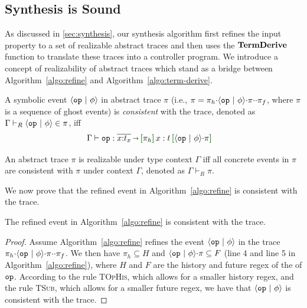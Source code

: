 \subsection{Synthesis is Sound}

As discussed in \autoref{sec:synthesis}, our synthesis algorithm first
refines the input property to a set of realizable abstract
traces and then uses the \(\S{TermDerive}\) function to translate these
traces into a controller program. We introduce a concept of realizability of abstract traces which stand as a bridge between Algorithm~\ref{algo:refine} and Algorithm~\ref{algo:term-derive}.

\begin{definition}
  \label{def:real-event-def}
  A symbolic event $\msg{op}{\phi}$ in abstract trace $\pi$ (i.e.,
  $\pi = \pi_h \seqA \msg{op}{\phi} \seqA \pi \seqA \seqA \pi_f$, where $\pi$ is a sequence of ghost events) is
  \emph{consistent} with the trace,
  denoted as $\Gamma \vdash_{R} \msg{op}{\phi} \in \pi$, iff {\small\begin{align*}
    &\Gamma \vdash \eff{op} : \overline{x{:}t_x}\sarr \uhat{\pi_h}{x:t}{\msg{op}{\phi}\seqA\pi}
\end{align*}}\noindent
\end{definition}

\begin{definition}[Realizability]
  \label{def:real-trace-def}
  An abstract trace $\pi$ is realizable under type context $\Gamma$ iff all concrete events in $\pi$ are consistent with $\pi$ under context $\Gamma$, denoted as $\Gamma \vdash_{R} \pi$.
\end{definition}

We now prove that the refined event in Algorithm~\ref{algo:refine} is consistent with the trace.

\begin{lemma}
  \label{lemma:real-event}
  The refined event in Algorithm~\ref{algo:refine} is consistent with the trace.
\end{lemma}
\begin{proof}
  Assume Algorithm~\ref{algo:refine} refines the event $\msg{op}{\phi}$ in the trace $\pi_h \seqA \msg{op}{\phi} \seqA \pi \seqA \seqA \pi_f$. We then have $\pi_h \subseteq H$ and $\msg{op}{\phi} \seqA \pi \subseteq F$ (line 4 and line 5 in Algorithm~\ref{algo:refine}), where $H$ and $F$ are the history and future regex of the \tyName{} of $\eff{op}$. According to the rule \textsc{TOpHis}, which allows for a smaller history regex, and the rule \textsc{TSub}, which allows for a smaller future regex, we have that $\msg{op}{\phi}$ is consistent with the trace.
\end{proof}

